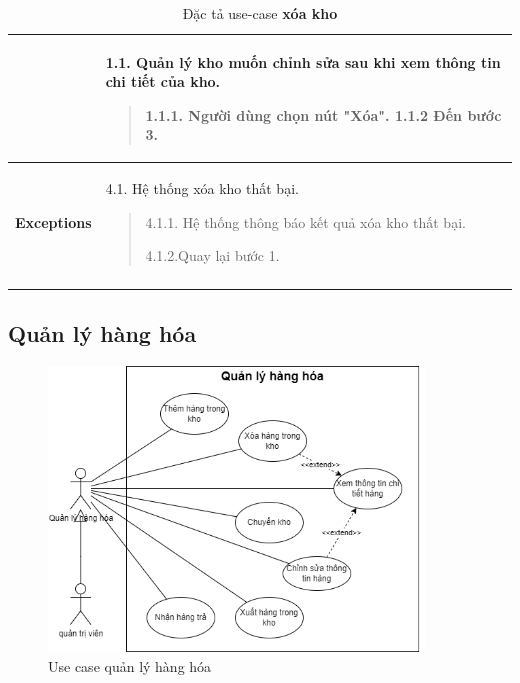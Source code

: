 \begin{longtable}{| p{} | p{} |}
\begin{flushleft}
                \end{flushleft}
                & 
                1.1. Quản lý kho muốn chỉnh sửa sau khi xem thông tin chi tiết của kho.
                    \begin{quote}
                    1.1.1. Người dùng chọn nút "Xóa".
                        1.1.2 Đến bước 3.
                    \end{quote}
                \\
                \hline
                \begin{flushleft}
                \textbf{Exceptions} 
                \end{flushleft}
                &
                4.1. Hệ thống xóa kho thất bại.
                    \begin{quote}
                    4.1.1. Hệ thống thông báo kết quả xóa kho thất bại.
                    
                    4.1.2.Quay lại bước 1.
                    \end{quote}
                \\
                \hline
                \caption{Đặc tả use-case \textbf{xóa kho}}
            \end{longtable}
    


    \subsection{Quản lý hàng hóa}
        \begin{figure}[!htp]
            \centering
            \includegraphics[width=10cm]{img/UseCase/UseCase-Quản lý hàng.drawio.png}
            \newline
            \caption{Use case quản lý hàng hóa}
        \end{figure}
        
